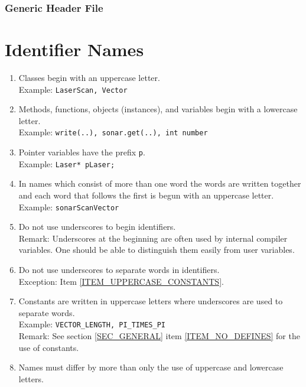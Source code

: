 \subsubsection{Generic Header File}
\label{SEC_GENERIC_HEADER}




\section{Identifier Names}
\label{SEC_IDENT_NAMES}

\begin{enumerate}
\item Classes begin with an uppercase letter. \\
  Example: {\tt LaserScan, Vector}
\item Methods, functions, objects (instances), and variables begin
  with a lowercase letter. \\ 
  Example: {\tt write(..), sonar.get(..), int number}
\item Pointer variables have the prefix {\tt p}. \\
  Example: {\tt Laser* pLaser;}
\item \label{ITEM_NAME_CONVENTION} 
  In names which consist of more than one word the words are
  written together and each word that follows the first is begun with an
  uppercase letter. \\ 
  Example: {\tt sonarScanVector}
\item Do not use underscores to begin identifiers. \\
  Remark: Underscores at the beginning are often used by internal compiler
  variables. One should be able to distinguish them easily from user variables.
\item Do not use underscores to separate words in identifiers. \\
  Exception: Item \ref{ITEM_UPPERCASE_CONSTANTS}.
\item \label{ITEM_UPPERCASE_CONSTANTS} Constants are written in
  uppercase letters where underscores are used to separate words. \\ 
  Example: {\tt VECTOR\_LENGTH, PI\_TIMES\_PI} \\
  Remark: See section \ref{SEC_GENERAL} item \ref{ITEM_NO_DEFINES} for the use
  of constants.
\item Names must differ by more than only the use of uppercase and
  lowercase letters.
\end{enumerate}

